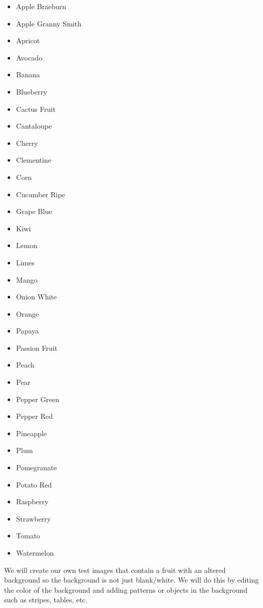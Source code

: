 \documentclass[11pt]{article}
\begin{document}
\begin{multicols}{2}
\begin{itemize}
      \item Apple Braeburn
      \item Apple Granny Smith
      \item Apricot
      \item Avocado
      \item Banana
      \item Blueberry
      \item Cactus Fruit
      \item Cantaloupe
      \item Cherry
      \item Clementine
      \item Corn
      \item Cucumber Ripe
      \item Grape Blue
      \item Kiwi
      \item Lemon
      \item Limes
      \item Mango
      \item Onion White
      \item Orange
      \item Papaya
      \item Passion Fruit
      \item Peach
      \item Pear
      \item Pepper Green
      \item Pepper Red
      \item Pineapple
      \item Plum
      \item Pomegranate
      \item Potato Red
      \item Raspberry
      \item Strawberry
      \item Tomato
      \item Watermelon 
\end{itemize}
\end{multicols}

\noindent We will create our own test images that contain a fruit with an altered background so the background is not just blank/white. We will do this by editing the color of the background and adding patterns or objects in the background such as stripes, tables, etc.
\end{document}
